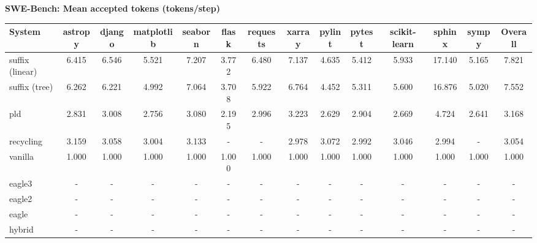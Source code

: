\textbf{SWE-Bench: Mean accepted tokens (tokens/step)}
\begin{table}[H]
\begin{adjustbox}{width=\linewidth}
\centering
\begin{tabular}{lccccccccccccc}
\toprule
\textbf{System} & astropy & django & matplotlib & seaborn & flask & requests & xarray & pylint & pytest & scikit-learn & sphinx & sympy & \textbf{Overall} \\
\midrule
suffix (linear) & 6.415 & 6.546 & 5.521 & 7.207 & 3.772 & 6.480 & 7.137 & 4.635 & 5.412 & 5.933 & 17.140 & 5.165 & 7.821 \\
suffix (tree) & 6.262 & 6.221 & 4.992 & 7.064 & 3.708 & 5.922 & 6.764 & 4.452 & 5.311 & 5.600 & 16.876 & 5.020 & 7.552 \\
pld & 2.831 & 3.008 & 2.756 & 3.080 & 2.195 & 2.996 & 3.223 & 2.629 & 2.904 & 2.669 & 4.724 & 2.641 & 3.168 \\
recycling & 3.159 & 3.058 & 3.004 & 3.133 & - & - & 2.978 & 3.072 & 2.992 & 3.046 & 2.994 & - & 3.054 \\
vanilla & 1.000 & 1.000 & 1.000 & 1.000 & 1.000 & 1.000 & 1.000 & 1.000 & 1.000 & 1.000 & 1.000 & 1.000 & 1.000 \\
eagle3 & - & - & - & - & - & - & - & - & - & - & - & - & - \\
eagle2 & - & - & - & - & - & - & - & - & - & - & - & - & - \\
eagle & - & - & - & - & - & - & - & - & - & - & - & - & - \\
hybrid & - & - & - & - & - & - & - & - & - & - & - & - & - \\
\bottomrule
\end{tabular}
\end{adjustbox}
\end{table}

